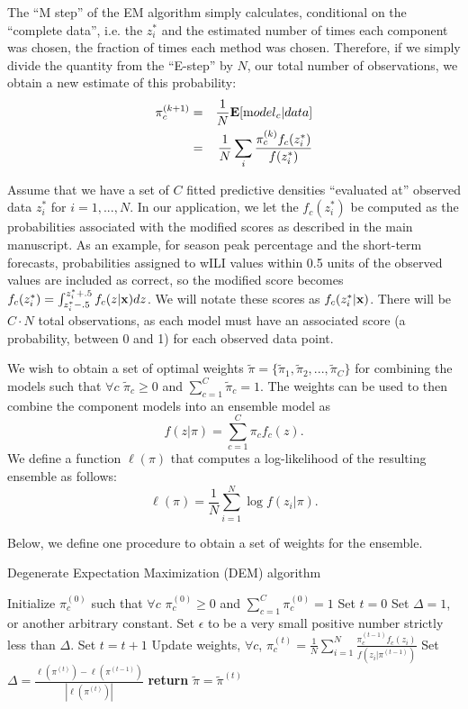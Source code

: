 \documentclass{article}\usepackage[]{graphicx}\usepackage[]{color}
\begin{document}
The ``M step'' of the EM algorithm simply calculates, conditional on the ``complete data'', i.e. the $z^*_i$ and the estimated number of times each component was chosen, the fraction of times each method was chosen. Therefore, if we simply divide the quantity from the ``E-step'' by $N$, our total number of observations, we obtain a new estimate of this probability: 
\begin{eqnarray}
\pi_c^{(k+1)} & = & \frac{1}{N} {\mathbf E}[ {\mbox model}_c |data ] \\
& = & \frac{1}{N} \sum_i \frac{\pi^{(k)}_c f_c(z_i^*)}{f(z_i^*)} 
\end{eqnarray}

Assume that we have a set of $C$ fitted predictive densities ``evaluated at'' observed data  $z_i^*$ for $i=1, ..., N$.
In our application, we let the $f_c(z_i^*)$ be computed as the probabilities associated with the modified scores as described in the main manuscript.
As an example, for season peak percentage and the short-term forecasts, probabilities assigned to wILI values within 0.5 units of the observed values are included as correct, so the modified score becomes $f_c(z_i^*) = \int_{z_i^* -.5}^{z_i^* + .5} f_c(z|{\bf{x}})dz$.
We will notate these scores as  $f_{c}(z_i^*|{\bf x})$. There will be $C\cdot N$ total observations, as each model must have an associated score (a probability, between 0 and 1) for each observed data point.

We wish to obtain a set of optimal weights $\tilde\pi = \{\tilde\pi_1, \tilde\pi_2, ..., \tilde\pi_C\}$ for combining the models such that $\forall c$ $\tilde\pi_c \geq 0$ and $\sum_{c=1}^C \tilde\pi_c=1$.
The weights can be used to then combine the component models into an ensemble model as
$$f(z|\pi) = \sum_{c=1}^C \pi_c f_c(z).$$
We define a function $\ell(\pi)$ that computes a log-likelihood of the resulting ensemble as follows:
$$\ell(\pi) = \frac{1}{N}\sum_{i=1}^N \log f(z_i|\pi).$$

Below, we define one procedure to obtain a set of weights for the ensemble.

\begin{algorithm}
\caption{Degenerate Expectation Maximization (DEM) algorithm}\label{alg:DEM}
\begin{algorithmic}[1]
\State Initialize $\pi_c^{(0)}$ such that $\forall c$ $\pi_c^{(0)} \geq 0$ and $\sum_{c=1}^C \pi_c^{(0)}=1$ 
\State Set $t=0$
\State Set $\Delta=1$, or another arbitrary constant.
\State Set $\epsilon$ to be a very small positive number strictly less than $\Delta$.
\While{$ \Delta > \epsilon$}%
\State Set $t=t+1$
\State Update weights, $\forall c$, $\pi_c^{(t)} = \frac{1}{N}\sum_{i=1}^N \frac{\pi_c^{(t-1)}f_c(z_i)}{f(z_i|\pi^{(t-1)})}$
\State Set $\Delta =  \frac{\ell(\pi^{(t)}) - \ell(\pi^{(t-1)})}{|\ell(\pi^{(t)})|}$ \label{delta-step}
\EndWhile
\State \textbf{return} $\tilde\pi = \tilde\pi^{(t)}$%
\EndProcedure
\end{algorithmic}
\end{algorithm}
\end{document}
